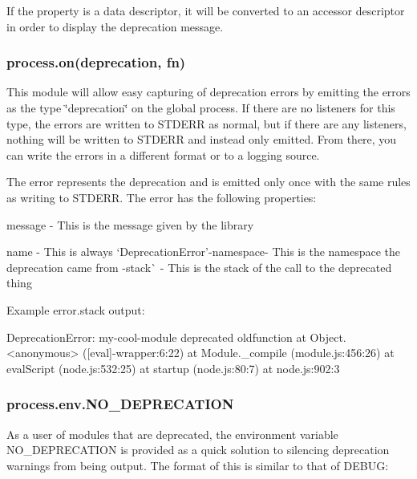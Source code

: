 If the property is a data descriptor, it will be converted to an accessor descriptor in order to display the deprecation message.

\subsubsection*{process.\+on(\textquotesingle{}deprecation\textquotesingle{}, fn)}

This module will allow easy capturing of deprecation errors by emitting the errors as the type \char`\"{}deprecation\char`\"{} on the global {\ttfamily process}. If there are no listeners for this type, the errors are written to S\+T\+D\+E\+RR as normal, but if there are any listeners, nothing will be written to S\+T\+D\+E\+RR and instead only emitted. From there, you can write the errors in a different format or to a logging source.

The error represents the deprecation and is emitted only once with the same rules as writing to S\+T\+D\+E\+RR. The error has the following properties\+:


\begin{DoxyItemize}
\item {\ttfamily message} -\/ This is the message given by the library
\item {\ttfamily name} -\/ This is always `\textquotesingle{}Deprecation\+Error'{\ttfamily  -\/}namespace{\ttfamily -\/ This is the namespace the deprecation came from -\/}stack\`{} -\/ This is the stack of the call to the deprecated thing
\end{DoxyItemize}

Example {\ttfamily error.\+stack} output\+:


\begin{DoxyCode}
DeprecationError: my-cool-module deprecated oldfunction
    at Object.<anonymous> ([eval]-wrapper:6:22)
    at Module.\_compile (module.js:456:26)
    at evalScript (node.js:532:25)
    at startup (node.js:80:7)
    at node.js:902:3
\end{DoxyCode}


\subsubsection*{process.\+env.\+N\+O\+\_\+\+D\+E\+P\+R\+E\+C\+A\+T\+I\+ON}

As a user of modules that are deprecated, the environment variable {\ttfamily N\+O\+\_\+\+D\+E\+P\+R\+E\+C\+A\+T\+I\+ON} is provided as a quick solution to silencing deprecation warnings from being output. The format of this is similar to that of {\ttfamily D\+E\+B\+UG}\+:



